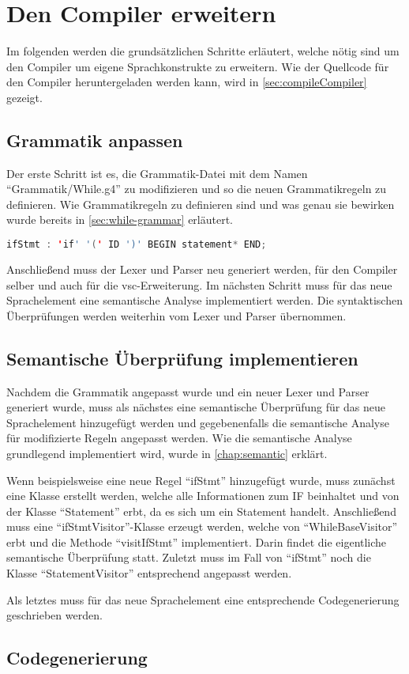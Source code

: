\section{Den Compiler erweitern} 

Im folgenden werden die grundsätzlichen Schritte erläutert, welche nötig sind um den Compiler um eigene Sprachkonstrukte zu erweitern. Wie der Quellcode für den Compiler heruntergeladen werden kann, wird in \cref{sec:compileCompiler} gezeigt.

\subsection{Grammatik anpassen}
Der erste Schritt ist es, die Grammatik-Datei mit dem Namen \enquote{Grammatik/While.g4} zu modifizieren und so die neuen Grammatikregeln zu definieren. Wie Grammatikregeln zu definieren sind und was genau sie bewirken wurde bereits in \cref{sec:while-grammar} erläutert.  

\begin{lstlisting}[language=java, caption=Grammatikregel für ein IF, label={lst:howto-grammar-if}]
ifStmt : 'if' '(' ID ')' BEGIN statement* END;
\end{lstlisting}

Anschließend muss der Lexer und Parser neu generiert werden, für den Compiler selber und auch für die \ac{vsc}-Erweiterung. Im nächsten Schritt muss für das neue Sprachelement eine semantische Analyse implementiert werden. Die syntaktischen Überprüfungen werden weiterhin vom Lexer und Parser übernommen.


\subsection{Semantische Überprüfung implementieren}
Nachdem die Grammatik angepasst wurde und ein neuer Lexer und Parser generiert wurde, muss als nächstes eine semantische Überprüfung für das neue Sprachelement hinzugefügt werden und gegebenenfalls die semantische Analyse für modifizierte Regeln angepasst werden. Wie die semantische Analyse grundlegend implementiert wird, wurde in \cref{chap:semantic} erklärt.  

Wenn beispielsweise eine neue Regel \enquote{ifStmt} hinzugefügt wurde, muss zunächst eine Klasse erstellt werden, welche alle Informationen zum IF beinhaltet und von der Klasse \enquote{Statement} erbt, da es sich um ein Statement handelt. Anschließend muss eine \enquote{ifStmtVisitor}-Klasse erzeugt werden, welche von \enquote{WhileBaseVisitor} erbt und die Methode \enquote{visitIfStmt} implementiert. Darin findet die eigentliche semantische Überprüfung statt. Zuletzt muss im Fall von \enquote{ifStmt} noch die Klasse \enquote{StatementVisitor} entsprechend angepasst werden.

Als letztes muss für das neue Sprachelement eine entsprechende Codegenerierung geschrieben werden.

\subsection{Codegenerierung}